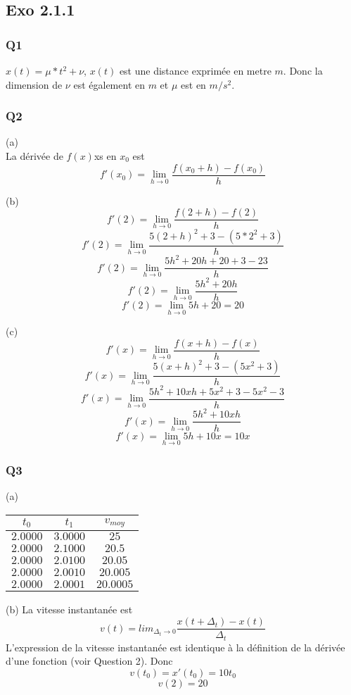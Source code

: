 \documentclass[]{book}
\theoremstyle{definition}
\begin{document}
\subsection*{Exo 2.1.1}
\subsubsection*{Q1}
$x(t)=\mu*t^2+\nu$, $x(t)$ est une distance exprim\'ee en metre $m$. Donc
la dimension de $\nu$ est \'egalement en $m$ et $\mu$ est en $m/s^2$.

\subsubsection*{Q2}
(a) \\
La d\'eriv\'ee de $f(x)$xs en $x_0$ est
$$f'(x_0) = \lim_{h \to 0} \frac{f(x_0+h)-f(x_0)}{h}$$


(b)
$$f'(2) = \lim_{h \to 0} \frac{f(2+h)-f(2)}{h}$$
$$f'(2) = \lim_{h \to 0} \frac{5(2+h)^2+3-(5*2^2+3)}{h}$$
$$f'(2) = \lim_{h \to 0} \frac{5h^2+20h+20+3-23}{h}$$
$$f'(2) = \lim_{h \to 0} \frac{5h^2+20h}{h}$$
$$f'(2) = \lim_{h \to 0} 5h+20 = 20$$

(c)
$$f'(x) = \lim_{h \to 0} \frac{f(x+h)-f(x)}{h}$$
$$f'(x) = \lim_{h \to 0} \frac{5(x+h)^2+3-(5x^2+3)}{h}$$
$$f'(x) = \lim_{h \to 0} \frac{5h^2+10xh+5x^2+3-5x^2 -3}{h}$$
$$f'(x) = \lim_{h \to 0} \frac{5h^2+10xh}{h}$$
$$f'(x) = \lim_{h \to 0} 5h+10x = 10x$$

\subsubsection*{Q3}
(a)
\begin{center}
\begin{tabular}{c|c|c} 
                         $t_0$         & $t_1$  & $v _{moy}$ \\
      \hline
     $2.0000$ & $3.0000$ & $25$ \\
     $2.0000$ & $2.1000$ & $20.5$ \\
     $2.0000$ & $2.0100$ & $20.05$ \\
     $2.0000$ & $2.0010$ & $20.005$ \\
     $2.0000$ & $2.0001$ & $20.0005$ \\
\end{tabular}
\end{center}

(b) La vitesse instantan\'ee est 
$$v(t)=lim_{\Delta_t \to 0} \frac{x(t+\Delta_t)-x(t)}{\Delta_t}$$ 
L'expression de la vitesse instantan\'ee est identique \`a la
d\'efinition de la d\'eriv\'ee d'une fonction (voir Question 2). Donc 
$$v(t_0)=x'(t_0)=10t_0$$
$$v(2)=20$$
\end{document}
